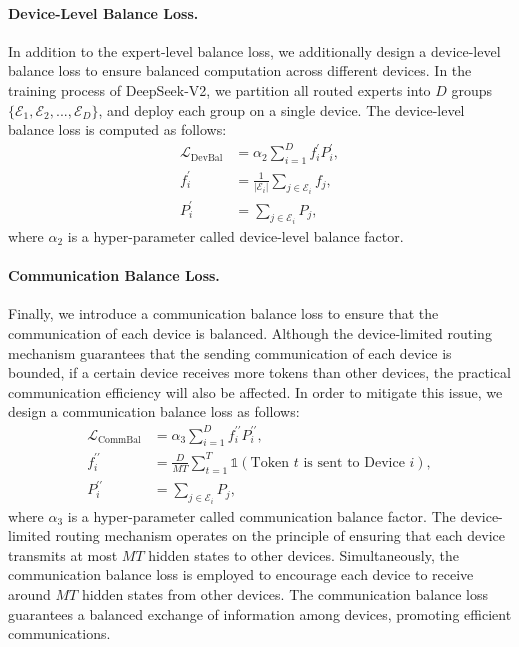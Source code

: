 \documentclass[11pt, a4paper, logo, copyright, nonumbering]{deepseek}
\newcommand{\dsvii}{DeepSeek-V2}
\begin{document}
\begin{CJK*}{UTF8}{gbsn}
\paragraph{Device-Level Balance Loss.}
In addition to the expert-level balance loss, we additionally design a device-level balance loss to ensure balanced computation across different devices.
In the training process of \dsvii{}, we partition all routed experts into $D$ groups $\{\mathcal{E}_1, \mathcal{E}_2, ..., \mathcal{E}_D \}$, and deploy each group on a single device. 
The device-level balance loss is computed as follows:
\begin{align}
    \mathcal{L}_{\mathrm{DevBal}} & = \alpha_{2} \sum_{i=1}^{D}{f_i^{\prime} P_i^{\prime}}, \\
    f_i^{\prime} & = \frac{1}{|\mathcal{E}_i|} \sum_{j \in \mathcal{E}_i}{ f_j }, \\
    P_i^{\prime} & = \sum_{j \in \mathcal{E}_i}{ P_j },
\end{align}
where $\alpha_{2}$ is a hyper-parameter called device-level balance factor. 

\paragraph{Communication Balance Loss.}
Finally, we introduce a communication balance loss to ensure that the communication of each device is balanced. 
Although the device-limited routing mechanism guarantees that the sending communication of each device is bounded, if a certain device receives more tokens than other devices, the practical communication efficiency will also be affected. 
In order to mitigate this issue, we design a communication balance loss as follows: 
\begin{align}
    \mathcal{L}_{\mathrm{CommBal}} & = \alpha_{3} \sum_{i=1}^{D}{f_i^{\prime\prime} P_i^{\prime\prime}}, \\
    f_i^{\prime\prime} & = \frac{D}{M T} \sum_{t=1}^{T}{ \mathds{1}( \text{Token $t$ is sent to Device $i$} )}, \\
    P_i^{\prime\prime} & = \sum_{j \in \mathcal{E}_i}{ P_j },
\end{align}
where $\alpha_{3}$ is a hyper-parameter called communication balance factor. 
The device-limited routing mechanism operates on the principle of ensuring that each device transmits at most $MT$ hidden states to other devices. 
Simultaneously, the communication balance loss is employed to encourage each device to receive around $MT$ hidden states from other devices. 
The communication balance loss guarantees a balanced exchange of information among devices, promoting efficient communications. 


\end{CJK*}
\end{document}
